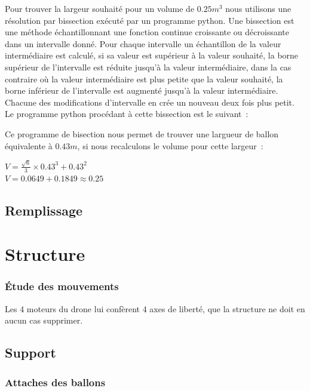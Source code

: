 \documentclass[a4paper,11pt]{article}
\begin{document}
Pour trouver la largeur souhaité pour un volume de $0.25m^3$ nous utilisons une résolution par bissection exécuté par un programme python. Une bissection est une méthode échantillonnant une fonction continue croissante ou décroissante dans un intervalle donné. Pour chaque intervalle un échantillon de la valeur intermédiaire est calculé, si sa valeur est supérieur à la valeur souhaité, la borne supérieur de l'intervalle est réduite jusqu'à la valeur intermédiaire, dans la cas contraire où la valeur intermédiaire est plus petite que la valeur souhaité, la borne inférieur de l'intervalle est augmenté jusqu'à la valeur intermédiaire. Chacune des modifications d'intervalle en crée un nouveau deux fois plus petit.
\medbreak
Le programme python procédant à cette bissection est le suivant~:



Ce programme de bisection nous permet de trouver une largueur de ballon équivalente à $0.43m$, si nous recalculons le volume pour cette largeur~:

\begin{center}
  $\displaystyle{V = \frac{\sqrt{6}}{3} \times 0.43^3 + 0.43^2 }$ \\
	$\displaystyle{V = 0.0649 + 0.1849 \approx 0.25}$
\end{center}

\subsection{Remplissage}


\section{Structure}

\subsubsection{Étude des mouvements}

Les 4 moteurs du drone lui confèrent 4 axes de liberté, que la structure ne doit en aucun cas supprimer.

\subsection{Support}

\subsubsection{Attaches des ballons}
\end{document}
